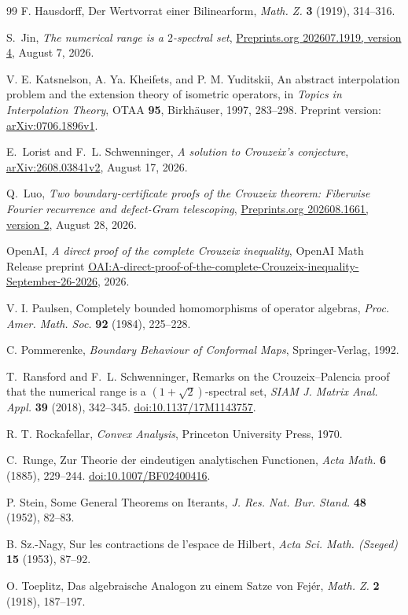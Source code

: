 \begin{thebibliography}{99}
F. Hausdorff, Der Wertvorrat einer Bilinearform,
\emph{Math. Z.} \textbf{3} (1919), 314--316.

S.~Jin, \emph{The numerical range is a $2$-spectral set},
\href{https://www.preprints.org/manuscript/202607.1919/v4}{Preprints.org 202607.1919, version 4},
August 7, 2026.

V. E. Katsnelson, A. Ya. Kheifets, and P. M. Yuditskii,
An abstract interpolation problem and the extension theory of isometric operators,
in \emph{Topics in Interpolation Theory}, OTAA \textbf{95},
Birkh\"auser, 1997, 283--298.
Preprint version: \href{https://arxiv.org/abs/0706.1896v1}{arXiv:0706.1896v1}.

E.~Lorist and F.~L. Schwenninger,
\emph{A solution to Crouzeix's conjecture},
\href{https://arxiv.org/abs/2608.03841v2}{arXiv:2608.03841v2}, August 17, 2026.

Q.~Luo, \emph{Two boundary-certificate proofs of the Crouzeix theorem:
Fiberwise Fourier recurrence and defect-Gram telescoping},
\href{https://www.preprints.org/manuscript/202608.1661/v2}{Preprints.org 202608.1661, version 2},
August 28, 2026.

OpenAI, \emph{A direct proof of the complete Crouzeix inequality},
OpenAI Math Release preprint
\href{https://github.com/openai/math/blob/main/preprints/A-direct-proof-of-the-complete-Crouzeix-inequality-September-26-2026/paper.pdf}{OAI:A-direct-proof-of-the-complete-Crouzeix-inequality-September-26-2026},
2026.

V. I. Paulsen, Completely bounded homomorphisms of operator algebras,
\emph{Proc. Amer. Math. Soc.} \textbf{92} (1984), 225--228.

C. Pommerenke, \emph{Boundary Behaviour of Conformal Maps},
Springer-Verlag, 1992.

T.~Ransford and F.~L. Schwenninger,
Remarks on the Crouzeix--Palencia proof that the numerical range is a
$(1+\sqrt{2})$-spectral set,
\emph{SIAM J. Matrix Anal. Appl.} \textbf{39} (2018), 342--345.
\href{https://doi.org/10.1137/17M1143757}{doi:10.1137/17M1143757}.

R. T. Rockafellar, \emph{Convex Analysis}, Princeton University Press, 1970.

C.~Runge, Zur Theorie der eindeutigen analytischen Functionen,
\emph{Acta Math.} \textbf{6} (1885), 229--244.
\href{https://doi.org/10.1007/BF02400416}{doi:10.1007/BF02400416}.

P. Stein, Some General Theorems on Iterants,
\emph{J. Res. Nat. Bur. Stand.} \textbf{48} (1952), 82--83.

B. Sz.-Nagy, Sur les contractions de l'espace de Hilbert,
\emph{Acta Sci. Math. (Szeged)} \textbf{15} (1953), 87--92.

O. Toeplitz, Das algebraische Analogon zu einem Satze von Fej\'er,
\emph{Math. Z.} \textbf{2} (1918), 187--197.

\end{thebibliography}

